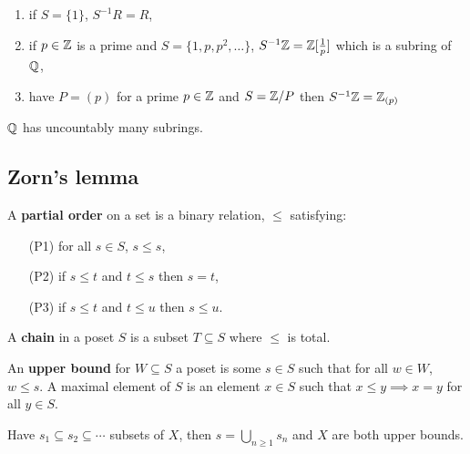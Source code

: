 \documentclass{report}
\begin{document}
\begin{examples}
    \begin{enumerate}
        \item if $S=\{1\}$, $S^{-1}R=R$,
        \item if $p\in\mathbb{Z}$ is a prime and $S=\{1,p,p^2,\ldots\}$, $S^{-1}\mathbb{Z}=\mathbb{Z}[\frac{1}{p}]$ which is a subring of $\mathbb{Q}$,
        \item have $P=(p)$ for a prime $p\in\mathbb{Z}$ and $S=\mathbb{Z}/P$ then $S^{-1}\mathbb{Z}=\mathbb{Z}_{(p)}$
    \end{enumerate}
\end{examples}

\begin{proposition}
    $\mathbb{Q}$ has uncountably many subrings.
\end{proposition}

\subsection{Zorn's lemma}

\begin{definition}
    A \textbf{partial order} on a set is a binary relation, $\leq$ satisfying: \begin{enumerate}
        \item[(P1)] for all $s\in S$, $s\leq s$,
        \item[(P2)] if $s\leq t$ and $t\leq s$ then $s=t$,
        \item[(P3)] if $s\leq t$ and $t\leq u$ then $s\leq u$.
    \end{enumerate}
\end{definition}

\begin{definition}[Chain]
    A \textbf{chain} in a poset $S$ is a subset $T\subseteq S$ where $\leq$ is total.
\end{definition}

\begin{definition}
    An \textbf{upper bound} for $W\subseteq S$ a poset is some $s\in S$ such that for all $w\in W$, $w\leq s$. A maximal element of $S$ is an element $x\in S$ such that $x\leq y\implies x=y$ for all $y\in S$.
\end{definition}

\begin{example}
    Have $s_1\subseteq s_2\subseteq \cdots$ subsets of $X$, then $s=\bigcup_{n\geq1}s_n$ and $X$ are both upper bounds.
\end{example}
\end{document}
